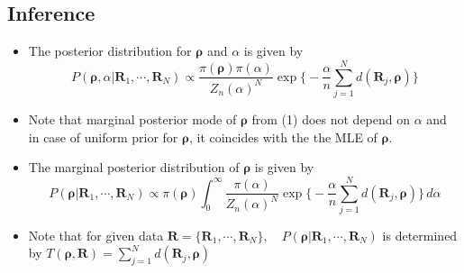 \documentclass[12pt]{article}
\begin{document}
\subsection{Inference}
\begin{itemize}
    \item The posterior distribution for $\boldsymbol{\rho}$ and $\alpha$ is given by
    \begin{equation}
        P(\boldsymbol{\rho}, \alpha| \mathbf{R}_1, \cdots, \mathbf{R}_N)\propto \frac{\pi(\boldsymbol{\rho})\pi(\alpha)}{Z_n(\alpha)^N} \exp \big\{-\frac{\alpha}{n}\sum_{j=1}^N d(\mathbf{R}_j, \boldsymbol{\rho})\big\}
    \end{equation}
    \item Note that marginal posterior mode of $\boldsymbol{\rho}$ from (1) does not depend on $\alpha$ and in case of uniform prior for $\boldsymbol{\rho}$, it coincides with the the MLE of $\boldsymbol{\rho}$. 
    \item The marginal posterior distribution of $\boldsymbol{\rho}$ is given by 
    \begin{equation}
        P(\boldsymbol{\rho} | \mathbf{R}_1, \cdots, \mathbf{R}_N)\propto \pi(\boldsymbol{\rho})\int_0^\infty \frac{\pi(\alpha)}{Z_n(\alpha)^N} \exp \big\{-\frac{\alpha}{n}\sum_{j=1}^N d(\mathbf{R}_j, \boldsymbol{\rho})\big\}\, d\alpha
    \end{equation}
    \item Note that for given data $\mathbf{R}=\{\mathbf{R}_1, \cdots, \mathbf{R}_N\},\quad  P(\boldsymbol{\rho} | \mathbf{R}_1, \cdots, \mathbf{R}_N)$ is determined \\ by $T(\boldsymbol{\rho}, \mathbf{R})=\sum_{j=1}^N d(\mathbf{R}_j, \boldsymbol{\rho})$
\end{itemize}
\end{document}
